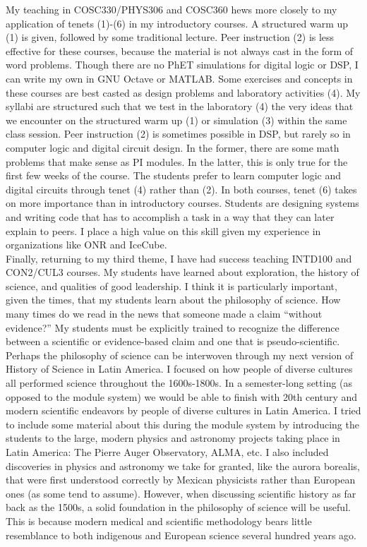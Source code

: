 \documentclass[../../../main.tex]{subfiles}
\begin{document}
My teaching in COSC330/PHYS306 and COSC360 hews more closely to my application of tenets (1)-(6) in my introductory courses.  A structured warm up (1) is given, followed by some traditional lecture.  Peer instruction (2) is less effective for these courses, because the material is not always cast in the form of word problems.  Though there are no PhET simulations for digital logic or DSP, I can write my own in GNU Octave or MATLAB.  Some exercises and concepts in these courses are best casted as design problems and laboratory activities (4).  My syllabi are structured such that we test in the laboratory (4) the very ideas that we encounter on the structured warm up (1) or simulation (3) within the same class session.  Peer instruction (2) is sometimes possible in DSP, but rarely so in computer logic and digital circuit design.  In the former, there are some math problems that make sense as PI modules.  In the latter, this is only true for the first few weeks of the course.  The students prefer to learn computer logic and digital circuits through tenet (4) rather than (2).  In both courses, tenet (6) takes on more importance than in introductory courses.  Students are designing systems and writing code that has to accomplish a task in a way that they can later explain to peers.  I place a high value on this skill given my experience in organizations like ONR and IceCube.
\\
\vspace{0.15cm}
Finally, returning to my third theme, I have had success teaching INTD100 and CON2/CUL3 courses.  My students have learned about exploration, the history of science, and qualities of good leadership.  I think it is particularly important, given the times, that my students learn about the philosophy of science.  How many times do we read in the news that someone made a claim ``without evidence?''  My students must be explicitly trained to recognize the difference between a scientific or evidence-based claim and one that is pseudo-scientific.  Perhaps the philosophy of science can be interwoven through my next version of History of Science in Latin America.  I focused on how people of diverse cultures all performed science throughout the 1600s-1800s.  In a semester-long setting (as opposed to the module system) we would be able to finish with 20th century and modern scientific endeavors by people of diverse cultures in Latin America.  I tried to include some material about this during the module system by introducing the students to the large, modern physics and astronomy projects taking place in Latin America: The Pierre Auger Observatory, ALMA, etc.  I also included discoveries in physics and astronomy we take for granted, like the aurora borealis, that were first understood correctly by Mexican physicists rather than European ones (as some tend to assume).  However, when discussing scientific history as far back as the 1500s, a solid foundation in the philosophy of science will be useful.  This is because modern medical and scientific methodology bears little resemblance to both indigenous and European science several hundred years ago.
\end{document}
